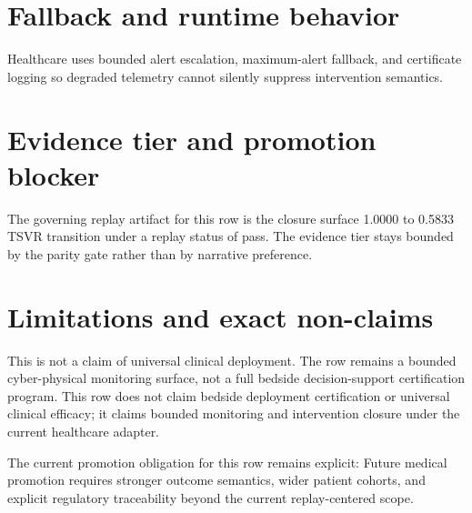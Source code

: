 \section{{Fallback and runtime behavior}}
Healthcare uses bounded alert escalation, maximum-alert fallback, and certificate logging so degraded telemetry cannot silently suppress intervention semantics.

\section{{Evidence tier and promotion blocker}}
The governing replay artifact for this row is the closure surface 1.0000 to 0.5833 TSVR transition under a replay status of pass. The evidence tier stays bounded by the parity gate rather than by narrative preference.



\section{{Limitations and exact non-claims}}
This is not a claim of universal clinical deployment. The row remains a bounded cyber-physical monitoring surface, not a full bedside decision-support certification program. This row does not claim bedside deployment certification or universal clinical efficacy; it claims bounded monitoring and intervention closure under the current healthcare adapter.

The current promotion obligation for this row remains explicit: Future medical promotion requires stronger outcome semantics, wider patient cohorts, and explicit regulatory traceability beyond the current replay-centered scope.
